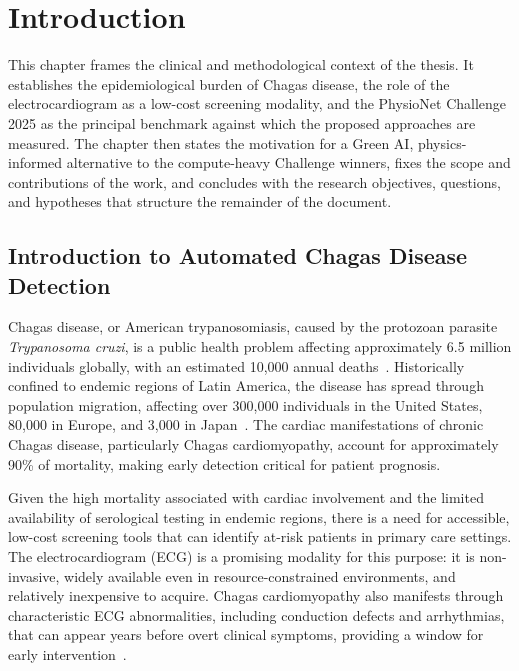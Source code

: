 \chapter{Introduction}
\label{chap:introduction}

This chapter frames the clinical and methodological context of the thesis. It establishes the epidemiological burden of Chagas disease, the role of the electrocardiogram as a low-cost screening modality, and the PhysioNet Challenge 2025 as the principal benchmark against which the proposed approaches are measured. The chapter then states the motivation for a Green AI, physics-informed alternative to the compute-heavy Challenge winners, fixes the scope and contributions of the work, and concludes with the research objectives, questions, and hypotheses that structure the remainder of the document.

\section{Introduction to Automated Chagas Disease Detection}

Chagas disease, or American trypanosomiasis, caused by the protozoan parasite \textit{Trypanosoma cruzi}, is a public health problem affecting approximately 6.5 million individuals globally, with an estimated 10,000 annual deaths~\cite{reyna2024detection}. Historically confined to endemic regions of Latin America, the disease has spread through population migration, affecting over 300,000 individuals in the United States, 80,000 in Europe, and 3,000 in Japan~\cite{sabino2024epidemiology}. The cardiac manifestations of chronic Chagas disease, particularly Chagas cardiomyopathy, account for approximately 90\% of mortality, making early detection critical for patient prognosis.

Given the high mortality associated with cardiac involvement and the limited availability of serological testing in endemic regions, there is a need for accessible, low-cost screening tools that can identify at-risk patients in primary care settings. The electrocardiogram (ECG) is a promising modality for this purpose: it is non-invasive, widely available even in resource-constrained environments, and relatively inexpensive to acquire. Chagas cardiomyopathy also manifests through characteristic ECG abnormalities, including conduction defects and arrhythmias, that can appear years before overt clinical symptoms, providing a window for early intervention~\cite{nunes2018chagas}.

